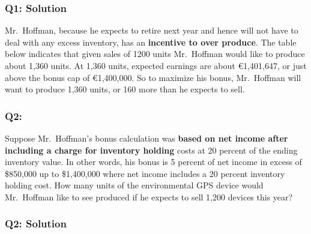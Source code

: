 \hypertarget{q1-solution-3}{%
\subsubsection{Q1: Solution}\label{q1-solution-3}}

Mr.~Hoffman, because he expects to retire next year and hence will not
have to deal with any excess inventory, has an \textbf{incentive to over
produce}. The table below indicates that given sales of 1200 units
Mr.~Hoffman would like to produce about 1,360 units. At 1,360 units,
expected earnings are about €1,401,647, or just above the bonus cap of
€1,400,000. So to maximize his bonus, Mr.~Hoffman will want to produce
1,360 units, or 160 more than he expects to sell.

\hypertarget{q2-2}{%
\subsubsection{Q2:}\label{q2-2}}

Suppose Mr.~Hoffman's bonus calculation was \textbf{based on net income
after including a charge for inventory holding} costs at 20 percent of
the ending inventory value. In other words, his bonus is 5 percent of
net income in excess of \$850,000 up to \$1,400,000 where net income
includes a 20 percent inventory holding cost. How many units of the
environmental GPS device would Mr.~Hoffman like to see produced if he
expects to sell 1,200 devices this year?

\hypertarget{q2-solution-2}{%
\subsubsection{Q2: Solution}\label{q2-solution-2}}

